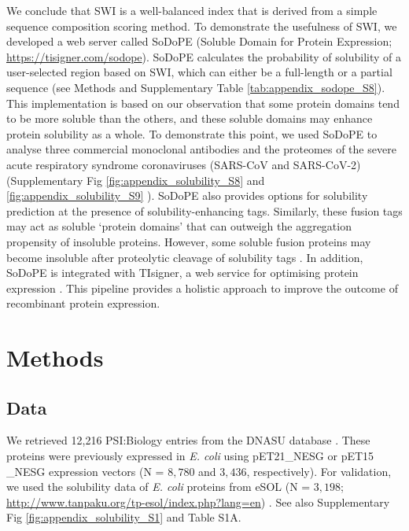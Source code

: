 We conclude that SWI is a well-balanced index that is derived from a simple sequence composition scoring method. To demonstrate the usefulness of SWI, we developed a web server called SoDoPE (Soluble Domain for Protein Expression; \href{https://tisigner.com/sodope}{https://tisigner.com/sodope}). SoDoPE calculates the probability of solubility of a user-selected region based on SWI, which can either be a full-length or a partial sequence (see Methods and Supplementary Table \ref{tab:appendix_sodope_S8}). This implementation is based on our observation that some protein domains tend to be more soluble than the others, and these soluble domains may enhance protein solubility as a whole. To demonstrate this point, we used SoDoPE to analyse three commercial monoclonal antibodies and the proteomes of the severe acute respiratory syndrome coronaviruses (SARS-CoV and SARS-CoV-2) \citep{Marra2003-zt,Wang2009-vj,Wu2020-oo} (Supplementary Fig \ref{fig:appendix_solubility_S8}  and \ref{fig:appendix_solubility_S9} ). SoDoPE also provides options for solubility prediction at the presence of solubility-enhancing tags. Similarly, these fusion tags may act as soluble ‘protein domains’ that can outweigh the aggregation propensity of insoluble proteins. However, some soluble fusion proteins may become insoluble after proteolytic cleavage of solubility tags \citep{Lebendiker2014-di}. In addition, SoDoPE is integrated with TIsigner, a web service for optimising protein expression \citep{Bhandari2021-wd}. This pipeline provides a holistic approach to improve the outcome of recombinant protein expression. \vspace*{-10pt}


\section{Methods}

\subsection{Data}
We retrieved 12,216 PSI:Biology entries from the DNASU database \citep{Chen2004-cp,Acton2005-ng,Seiler2014-on}. These proteins were previously expressed in {\it E. coli} using pET21\_NESG or pET15 \_NESG expression vectors (N = $8,780$ and $3,436$, respectively). For validation, we used the solubility data of {\it E. coli} proteins from eSOL (N = $3,198$; \href{http://www.tanpaku.org/tp-esol/index.php?lang=en}{http://www.tanpaku.org/tp-esol/index.php?lang=en}) \citep{Niwa2009-ye}. See also Supplementary Fig \ref{fig:appendix_solubility_S1}  and Table S1A. 

